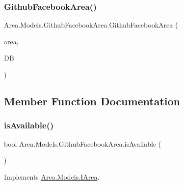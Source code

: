 \subsubsection{\texorpdfstring{Github\+Facebook\+Area()}{GithubFacebookArea()}}
{\footnotesize\ttfamily Area.\+Models.\+Github\+Facebook\+Area.\+Github\+Facebook\+Area (\begin{DoxyParamCaption}\item[{\mbox{\hyperlink{classArea_1_1Models_1_1AREA}{A\+R\+EA}}}]{area,  }\item[{\mbox{\hyperlink{classArea_1_1DAT_1_1AreaDbContext}{Area\+Db\+Context}}}]{DB }\end{DoxyParamCaption})\hspace{0.3cm}{\ttfamily [inline]}}



\subsection{Member Function Documentation}
\mbox{\label{classArea_1_1Models_1_1GithubFacebookArea_ab1f22cb94018e33fa92221c812da1020}} 
\subsubsection{\texorpdfstring{is\+Available()}{isAvailable()}}
{\footnotesize\ttfamily bool Area.\+Models.\+Github\+Facebook\+Area.\+is\+Available (\begin{DoxyParamCaption}{ }\end{DoxyParamCaption})\hspace{0.3cm}{\ttfamily [inline]}}



Implements \mbox{\hyperlink{interfaceArea_1_1Models_1_1IArea_a742b324f0d7573f7f99f9e2adb5df94c}{Area.\+Models.\+I\+Area}}.

